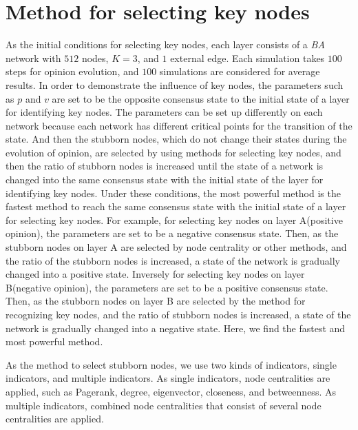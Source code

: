 \section{Method for selecting key nodes}
\label{sec:method for finding key nodes}
As the initial conditions for selecting key nodes, each layer consists of a \textit{BA} network with $512$ nodes, $K=3$, and $1$ external edge. Each simulation takes $100$ steps for opinion evolution, and $100$ simulations are considered for average results. In order to demonstrate the influence of key nodes, the parameters such as $p$ and $v$ are set to be the opposite consensus state to the initial state of a layer for identifying key nodes. The parameters can be set up differently on each network because each network has different critical points for the transition of the state. And then the stubborn nodes, which do not change their states during the evolution of opinion, are selected by using methods for selecting key nodes, and then the ratio of stubborn nodes is increased until the state of a network is changed into the same consensus state with the initial state of the layer for identifying key nodes. Under these conditions, the most powerful method is the fastest method to reach the same consensus state with the initial state of a layer for selecting key nodes. For example, for selecting key nodes on layer A(positive opinion), the parameters are set to be a negative consensus state. Then, as the stubborn nodes on layer A are selected by node centrality or other methods, and the ratio of the stubborn nodes is increased, a state of the network is gradually changed into a positive state. Inversely for selecting key nodes on layer B(negative opinion), the parameters are set to be a positive consensus state. Then, as the stubborn nodes on layer B are selected by the method for recognizing key nodes, and the ratio of stubborn nodes is increased, a state of the network is gradually changed into a negative state. Here, we find the fastest and most powerful method.

As the method to select stubborn nodes, we use two kinds of indicators, single indicators, and multiple indicators. As single indicators, node centralities are applied, such as Pagerank, degree, eigenvector, closeness, and betweenness. As multiple indicators, combined node centralities that consist of several node centralities are applied.
  
